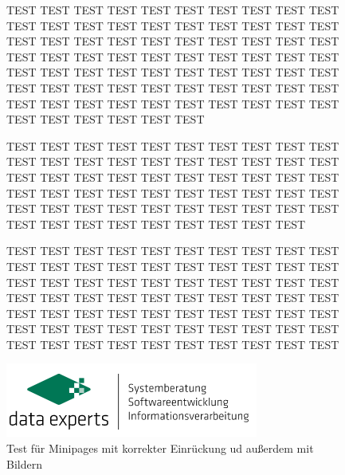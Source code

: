     \begin{figure}[H]
        \begin{minipage}{0.55\textwidth}
    
            TEST TEST TEST TEST TEST TEST TEST TEST TEST TEST TEST TEST TEST TEST TEST TEST TEST TEST TEST TEST TEST TEST TEST TEST TEST TEST TEST TEST TEST TEST TEST TEST TEST TEST TEST TEST TEST 
            TEST TEST TEST TEST TEST TEST TEST TEST TEST TEST TEST TEST TEST TEST TEST TEST TEST TEST TEST TEST TEST TEST TEST TEST TEST TEST TEST TEST TEST TEST TEST TEST TEST TEST TEST TEST TEST TEST TEST 
            
            TEST TEST TEST TEST TEST TEST TEST TEST TEST TEST TEST TEST TEST TEST TEST TEST TEST TEST TEST TEST TEST TEST TEST TEST TEST TEST TEST TEST TEST TEST TEST TEST TEST TEST TEST TEST TEST TEST TEST TEST TEST TEST TEST TEST TEST TEST TEST TEST TEST TEST TEST TEST TEST TEST TEST TEST TEST TEST TEST 

            TEST TEST TEST TEST TEST TEST TEST TEST TEST TEST TEST TEST TEST TEST TEST TEST TEST TEST TEST TEST TEST TEST TEST TEST TEST TEST TEST TEST TEST TEST TEST TEST TEST TEST TEST TEST TEST TEST TEST TEST TEST TEST TEST TEST TEST TEST TEST TEST TEST TEST TEST TEST TEST TEST TEST TEST TEST TEST TEST TEST TEST TEST TEST TEST TEST TEST TEST TEST TEST TEST 
        \end{minipage}
        \hspace{0.05\textwidth}
        \begin{minipage}{0.4\textwidth}
           \centering
            \includegraphics{image/data-experts-logo.png}
            \caption{Test für Minipages mit korrekter Einrückung ud außerdem mit Bildern}
            \label{fig:ex4}
        \end{minipage}
    \end{figure}
